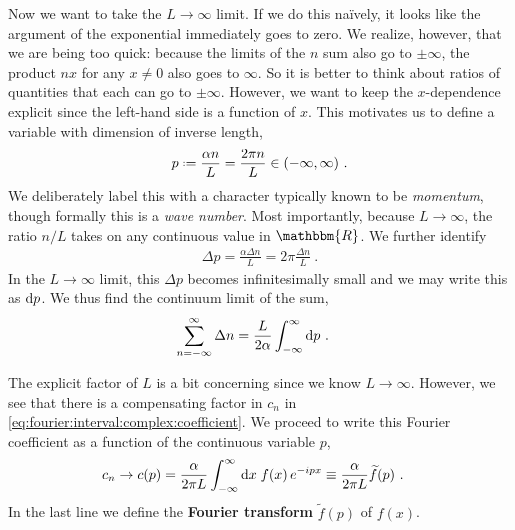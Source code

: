 \documentclass[12pt, oneside]{report}    %
\begin{document}
Now we want to take the $L\to \infty$ limit. If we do this na\"ively, it looks like the argument of the exponential immediately goes to zero. We realize, however, that we are being too quick: because the limits of the $n$ sum also go to $\pm \infty$, the product $nx$ for any $x\neq 0$ also goes to $\infty$. So it is better to think about ratios of quantities that each can go to $\pm\infty$. However, we want to keep the $x$-dependence explicit since the left-hand side is a function of $x$. This motivates us to define a variable with dimension of inverse length,
\begin{align}
    p \defeq \frac{\alpha n}{L} = \frac{2\pi n}{L} \in (-\infty,\infty) \ .
\end{align}
We deliberately label this with a character typically known to be \emph{momentum}, though formally this is a \emph{wave number}. Most importantly, because $L\to\infty$, the ratio $n/L$ takes on any continuous value in $\mathbbm{R}$. We further identify 
\begin{align}
    \Delta p = \frac{\alpha \Delta n}{L} = 2\pi\frac{\Delta n}{L} \ .
\end{align}
In the $L\to\infty$ limit, this $\Delta p$ becomes infinitesimally small and we may write this as $\operatorname{d}\!{p}$. We thus find the continuum limit of the sum,
\begin{align}
    \sum_{n=-\infty}^\infty \Delta n &=
    \frac{L}{2\alpha} \int_{-\infty}^\infty \operatorname{d}\!{p} \ .
    \label{eq:toward:fourier:transform:sum:to:int}
\end{align}


The explicit factor of $L$ is a bit concerning since we know $L\to\infty$. However, we see that there is a compensating factor in $c_n$ in \eqref{eq:fourier:interval:complex:coefficient}. We proceed to write this Fourier coefficient as a function of the continuous variable $p$,
\begin{align}
    c_n \to c(p)
     &= \frac{\alpha}{2\pi L} \int_{-\infty}^{\infty} \operatorname{d}\!{x}\; f(x)\, e^{-ip x} 
     \equiv 
     \frac{\alpha}{2\pi L} \widetilde{f}(p)
     \ .
    \label{eq:toward:fourier:transform:cn:to:cp}
\end{align}
In the last line we define the \textbf{Fourier transform} $\tilde{f}(p)$ of $f(x)$. 
\end{document}
